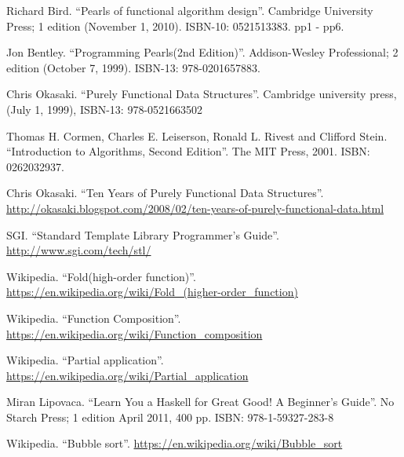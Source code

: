 
\begin{thebibliography}{99}


Richard Bird. ``Pearls of functional algorithm design''. Cambridge University Press; 1 edition (November 1, 2010). ISBN-10: 0521513383. pp1 - pp6.

Jon Bentley. ``Programming Pearls(2nd Edition)''. Addison-Wesley Professional; 2 edition (October 7, 1999). ISBN-13: 978-0201657883.

Chris Okasaki. ``Purely Functional Data Structures''. Cambridge university press, (July 1, 1999), ISBN-13: 978-0521663502

Thomas H. Cormen, Charles E. Leiserson, Ronald L. Rivest and Clifford Stein. ``Introduction to Algorithms, Second Edition''. The MIT Press, 2001. ISBN: 0262032937.


Chris Okasaki. ``Ten Years of Purely Functional Data Structures''. \url{http://okasaki.blogspot.com/2008/02/ten-years-of-purely-functional-data.html}

SGI. ``Standard Template Library Programmer's Guide''. \url{http://www.sgi.com/tech/stl/}


Wikipedia. ``Fold(high-order function)''. \url{https://en.wikipedia.org/wiki/Fold_(higher-order_function)}

Wikipedia. ``Function Composition''. \url{https://en.wikipedia.org/wiki/Function_composition}

Wikipedia. ``Partial application''. \url{https://en.wikipedia.org/wiki/Partial_application}

Miran Lipovaca. ``Learn You a Haskell for Great Good! A Beginner's Guide''. No Starch Press; 1 edition April 2011, 400 pp. ISBN: 978-1-59327-283-8

Wikipedia. ``Bubble sort''. \url{https://en.wikipedia.org/wiki/Bubble_sort}


\end{thebibliography}
